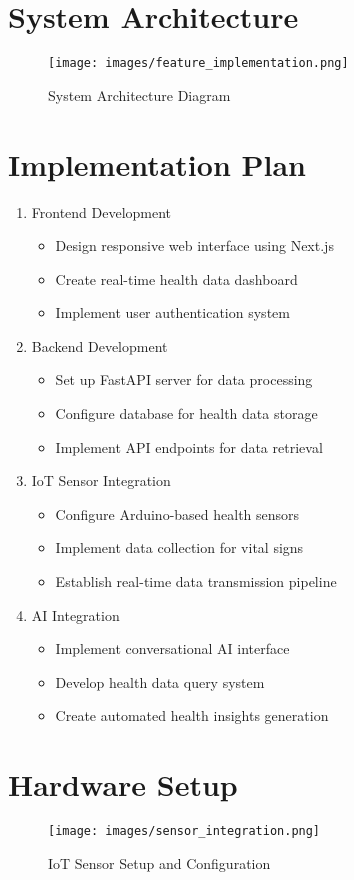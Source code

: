 \section{System Architecture}

\begin{figure}[h!]
\centering
\texttt{[image: images/feature\_implementation.png]}
\caption{System Architecture Diagram}
\end{figure}

\section{Implementation Plan}

\begin{enumerate}
    \item Frontend Development
    \begin{itemize}
        \item Design responsive web interface using Next.js
        \item Create real-time health data dashboard
        \item Implement user authentication system
    \end{itemize}

    \item Backend Development
    \begin{itemize}
        \item Set up FastAPI server for data processing
        \item Configure database for health data storage
        \item Implement API endpoints for data retrieval
    \end{itemize}

    \item IoT Sensor Integration
    \begin{itemize}
        \item Configure Arduino-based health sensors
        \item Implement data collection for vital signs
        \item Establish real-time data transmission pipeline
    \end{itemize}

    \item AI Integration
    \begin{itemize}
        \item Implement conversational AI interface
        \item Develop health data query system
        \item Create automated health insights generation
    \end{itemize}
\end{enumerate}

\section{Hardware Setup}

\begin{figure}[h!]
\centering
\texttt{[image: images/sensor\_integration.png]}
\caption{IoT Sensor Setup and Configuration}
\end{figure}